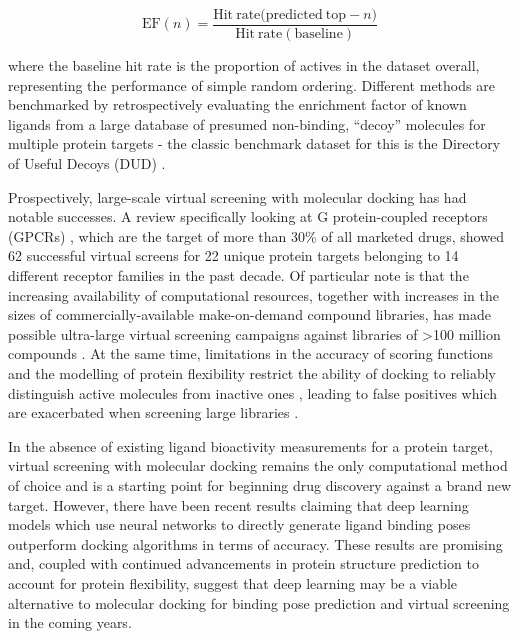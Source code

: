 \begin{equation}
 \mathrm{EF}(n) = \frac{\mathrm{Hit\: rate (predicted\: top - }n)}{\mathrm{Hit\: rate (baseline)}}
\end{equation}

where the baseline hit rate is the proportion of actives in the dataset overall, representing the performance of simple random ordering. Different methods are benchmarked by retrospectively evaluating the enrichment factor of known ligands from a large database of presumed non-binding, “decoy” molecules for multiple protein targets - the classic benchmark dataset for this is the Directory of Useful Decoys (DUD) \cite{Huang2006DUD, Mysinger2012DUDE}.

Prospectively, large-scale virtual screening with molecular docking has had notable successes. A review specifically looking at G protein-coupled receptors (GPCRs) \cite{Ballante2021DockingGPCR}, which are the target of more than 30\% of all marketed drugs, showed 62 successful virtual screens for 22 unique protein targets belonging to 14 different receptor families in the past decade. Of particular note is that the increasing availability of computational resources, together with increases in the sizes of commercially-available make-on-demand compound libraries, has made possible ultra-large virtual screening campaigns against libraries of >100 million compounds \cite{Lyu2019UltraLargeDocking, Alon2021sigma, Fink2022Alpha}. At the same time, limitations in the accuracy of scoring functions and the modelling of protein flexibility \cite{Erickson2004flexibility, Antunes2015flexibility} restrict the ability of docking to reliably distinguish active molecules from inactive ones \cite{Llanos2021StrengthsAndWeaknesses, Macip2022HasteMakesWaste}, leading to false positives which are exacerbated when screening large libraries \cite{Lyu2023Expansion}.

In the absence of existing ligand bioactivity measurements for a protein target, virtual screening with molecular docking remains the only computational method of choice and is a  starting point for beginning drug discovery against a brand new target. However, there have been recent results claiming that deep learning models which use neural networks to directly generate ligand binding poses \cite{Stark2022equibind, corso2023diffdock} outperform docking algorithms in terms of accuracy. These results are promising and, coupled with continued advancements in protein structure prediction to account for protein flexibility, suggest that deep learning may be a viable alternative to molecular docking for binding pose prediction and virtual screening in the coming years.

